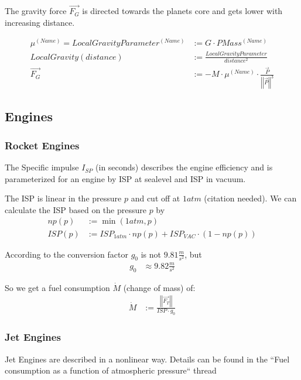 \documentclass[11pt]{article}
\newcommand{\oa}[1]{\overrightarrow{#1}}
\newcommand{\F}[1]{\oa{F_{#1}}}
\newcommand{\Pos}{\oa{P}}
\newcommand{\absvec}[1]{\left|\left|{#1}\right|\right|}
\begin{document}
The  gravity force $\F{G}$ is directed towards the
planets core and gets lower with increasing distance.

\begin{align}
  \mu^{(Name)} = LocalGravityParameter^{(Name)} &:= G \cdot PMass^{(Name)} \nonumber\\
  LocalGravity(distance) &:= \frac{LocalGravityParameter}{distance^2}\nonumber\\
  \F{G} &:= - M \cdot \mu^{(Name)}\cdot\frac{\Pos}{\absvec{\Pos}^3}
\end{align}

\subsection{Engines}

\subsubsection{Rocket Engines}

The  Specific impulse $I_{SP}$ (in seconds) describes the
engine efficiency and is parameterized for an engine by ISP at
sealevel and ISP in vacuum.

The ISP is linear in the pressure $p$ and cut off at $1atm$
(citation needed).  We can calculate the ISP based on the pressure
$p$ by
\begin{align}
  np(p) &:= \min(1 atm, p)\\
  ISP(p) &:= ISP_{1atm} \cdot np(p) + ISP_{VAC} \cdot (1-np(p))
\end{align}

According to \cite{ECF} the conversion factor $g_0$ is not
$9.81\frac{m}{s^2}$, but
\begin{align}
  g_0 &\approx 9.82\frac{m}{s^2}
\end{align}

So we get a fuel consumption $\dot{M}$ (change of mass) \cite{SPI} of:
\begin{align}
\dot{M} & := \frac{\absvec{\oa{F_T}}}{ISP \cdot g_0}
\end{align}

\subsubsection{Jet Engines}

Jet Engines are described in a nonlinear way. Details can be found in
the ``Fuel consumption as a function of atmospheric pressure`` thread
\cite{JetEngines}
\end{document}
